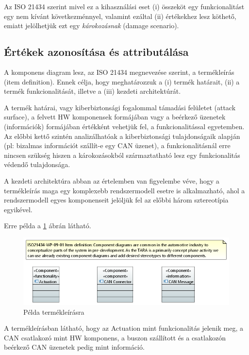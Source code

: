 Az ISO 21434 szerint mivel ez a kihasználási eset (i) összeköt egy funkcionalitást egy nem kívánt következménnyel, valamint ezáltal (ii) értékekhez lesz köthető, emiatt jelölhetjük ezt egy \textit{károkozásnak} (damage scenario). \\

\subsection{Értékek azonosítása és attributálása}

A komponens diagram lesz, az ISO 21434 megnevezése szerint, a termékleírás (item definition). Ennek célja, hogy meghatározzuk a (i) termék határait, (ii) a termék funkcionalitását, illetve a (iii) kezdeti architektúrát.

A termék határai, vagy kiberbiztonsági fogalommal támadási felületet (attack surface), a felvett HW komponensek formájában vagy a beérkező üzenetek (információk) formájában értékként vehetjük fel, a funkcionalitással egyetemben. Az előbbi kettő szintén analizálhatóak a kiberbiztonsági tulajdonságaik alapján (pl: bizalmas információt szállít-e egy CAN üzenet), a funkcionalitásnál erre nincsen szükség hiszen a károkozásokból származtatható lesz egy funkcionalitás védendő tulajdonsága.

A kezdeti architektúra abban az értelemben van figyelembe véve, hogy a termékleírás maga egy komplexebb rendszermodell esetre is alkalmazható, ahol a rendszermodell egyes komponenseit jelöljük fel az előbbi három sztereotípia egyikével.

Erre példa a \ref{fig:04_item_definition} ábrán látható.

\begin{figure}[!ht]
	\centering
	\includegraphics[width=130mm, keepaspectratio]{figures/04_item_definition.PNG}
	\caption{Példa termékleírásra}
	\label{fig:04_item_definition}
\end{figure}

A termékleírásban látható, hogy az Actuation mint funkcionalitás jelenik meg, a CAN csatlakozó mint HW komponens, a buszon szállított és a csatlakozón beérkező CAN üzenetek pedig mint információ. 

